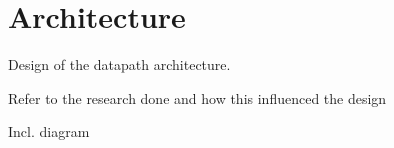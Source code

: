 

\chapter{Architecture}

Design of the datapath architecture.

Refer to the research done and how this influenced the design

Incl. diagram 




